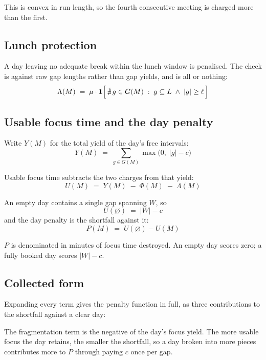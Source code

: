\documentclass[11pt]{article}
\begin{document}
This is convex in run length, so the fourth consecutive meeting is charged
more than the first.

\subsection{Lunch protection}

A day leaving no adequate break within the lunch window is penalised. The
check is against raw gap lengths rather than gap yields, and is all or
nothing:
\[
\Lambda(M) \;=\; \mu \cdot \mathbf{1}\Bigl[\, \nexists\, g \in G(M) \;:\;
g \subseteq L \;\wedge\; |g| \ge \ell \,\Bigr]
\]

\subsection{Usable focus time and the day penalty}

Write $Y(M)$ for the total yield of the day's free intervals:
\[
Y(M) \;=\; \sum_{g \in G(M)} \max\bigl(0,\; |g| - c\bigr)
\]

Usable focus time subtracts the two charges from that yield:
\[
U(M) \;=\; Y(M) \;-\; \Phi(M) \;-\; \Lambda(M)
\]

An empty day contains a single gap spanning $W$, so
\[
U(\varnothing) \;=\; |W| - c
\]
and the day penalty is the shortfall against it:
\[
P(M) \;=\; U(\varnothing) - U(M)
\]

$P$ is denominated in minutes of focus time destroyed. An empty day scores
zero; a fully booked day scores $|W| - c$.

\subsection{Collected form}

Expanding every term gives the penalty function in full, as three
contributions to the shortfall against a clear day:

\begin{center}
\end{center}

The fragmentation term is the negative of the day's focus yield. The more
usable focus the day retains, the smaller the shortfall, so a day broken
into more pieces contributes more to $P$ through paying $c$ once per gap.
\end{document}
